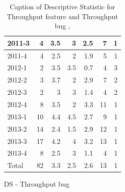 \documentclass[UKenglish]{ifimaster}  %
\begin{document}
\begin{appendices}
\begin{table}[!htbp]
\begin{adjustwidth}{-2.5cm}{}
\begin{subfigure}[b]{0.3\textwidth}
{\begin{tabular}{ | l | r | r | r | r | r | r | }
 2011-3  & 4 & 3.5 & 3 & 2.5 & 7 & 1 \\ \hline
 2011-4  & 4 & 2.5 & 2 & 1.9 & 5 & 1 \\ \hline
 2012-1  & 2 & 3.5 & 3.5 & 0.7 & 4 & 3 \\ \hline
 2012-2  & 3 & 3.7 & 2 & 2.9 & 7 & 2 \\ \hline
 2012-3  & 2 & 3 & 3 & 1.4 & 4 & 2 \\ \hline
 2012-4  & 8 & 3.5 & 2 & 3.3 & 11 & 1 \\ \hline
 2013-1  & 10 & 4.4 & 4.5 & 2.7 & 9 & 1 \\ \hline
 2013-2  & 14 & 2.4 & 1.5 & 2.9 & 12 & 1 \\ \hline
 2013-3  & 17 & 4.2 & 4 & 3.2 & 13 & 1 \\ \hline
 2013-4  & 8 & 2.5 & 3 & 1.1 & 4 & 1 \\ \hline
 Total  & 82 & 3.3 & 2.5 & 2.6 & 13 & 1 \\ \hline
\end{tabular}
}
\caption{DS - Throughput bug}
 \label{DS:TPB:6}
\end{subfigure}
\end{adjustwidth}
\caption[Optional caption for list of figures]{Caption of Descriptive Statistic for Throughput feature and Throughput bug  , }
\label{DS:6:2}
\end{table}




\end{appendices}
\end{document}
